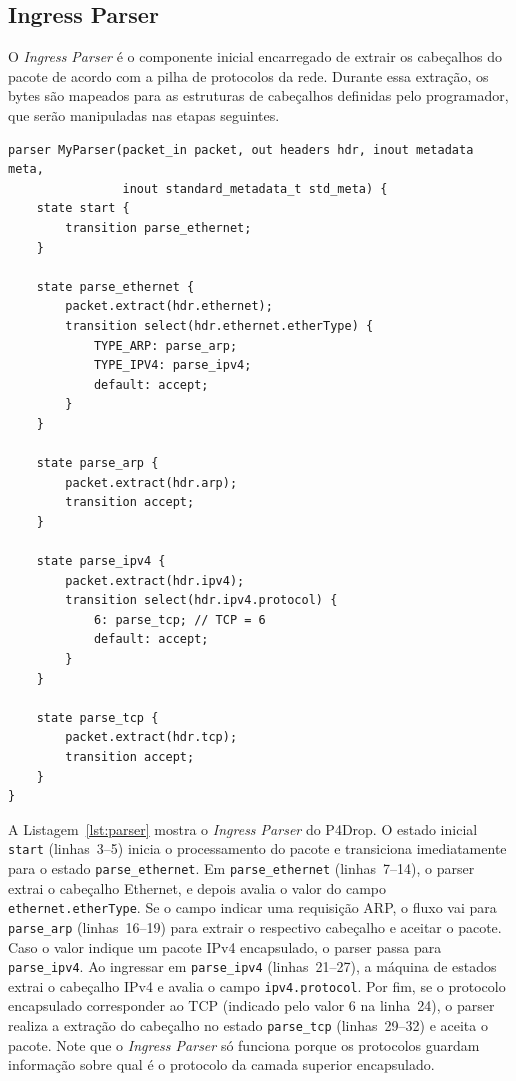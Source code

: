 \documentclass[12pt]{article}
\begin{document}
\subsection{Ingress Parser}
\label{sec:p4:iparser}

O \textit{Ingress Parser} é o componente inicial encarregado de extrair os cabeçalhos do pacote de acordo com a pilha de protocolos da rede.
Durante essa extração, os bytes são mapeados para as estruturas de cabeçalhos definidas pelo programador,
que serão manipuladas nas etapas seguintes.

\begin{lstlisting}[language=P4, caption={Definição do parser no P4Drop.}, label={lst:parser}]
parser MyParser(packet_in packet, out headers hdr, inout metadata meta,
                inout standard_metadata_t std_meta) {
    state start {
        transition parse_ethernet;
    }

    state parse_ethernet {
        packet.extract(hdr.ethernet);
        transition select(hdr.ethernet.etherType) {
            TYPE_ARP: parse_arp;
            TYPE_IPV4: parse_ipv4;
            default: accept;
        }
    }

    state parse_arp {
        packet.extract(hdr.arp);
        transition accept;
    }

    state parse_ipv4 {
        packet.extract(hdr.ipv4);
        transition select(hdr.ipv4.protocol) {
            6: parse_tcp; // TCP = 6
            default: accept;
        }
    }

    state parse_tcp {
        packet.extract(hdr.tcp);
        transition accept;
    }
}
\end{lstlisting}

A Listagem~\ref{lst:parser} mostra o \textit{Ingress Parser} do P4Drop.
O estado inicial \texttt{start} (linhas~3--5) inicia o processamento do pacote
e transiciona imediatamente para o estado \texttt{parse\_ethernet}.
Em \texttt{parse\_ethernet} (linhas~7--14), o parser extrai o cabeçalho Ethernet,
e depois avalia o valor do campo \texttt{ethernet.etherType}.
Se o campo indicar uma requisição ARP,
o fluxo vai para \texttt{parse\_arp} (linhas~16--19) para extrair o respectivo cabeçalho e aceitar o pacote.
Caso o valor indique um pacote IPv4 encapsulado, o parser passa para \texttt{parse\_ipv4}.
Ao ingressar em \texttt{parse\_ipv4} (linhas~21--27),
a máquina de estados extrai o cabeçalho IPv4 e avalia o campo \texttt{ipv4.protocol}.
Por fim, se o protocolo encapsulado corresponder ao TCP (indicado pelo valor 6 na linha~24),
o parser realiza a extração do cabeçalho no estado \texttt{parse\_tcp} (linhas~29--32) e aceita o pacote.
Note que o \textit{Ingress Parser} só funciona porque os protocolos guardam informação sobre qual é o protocolo da camada superior encapsulado.
\end{document}
